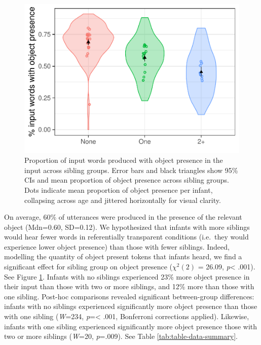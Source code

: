 \documentclass[
  english,
  man,floatsintext]{apa6}
\begin{document}
\begin{figure}
\centering
\includegraphics{SiblingsStudyText_files/figure-latex/Figure-object-presence-1.pdf}
\caption{\label{fig:Figure-object-presence}Proportion of input words produced with object presence in the input across sibling groups. Error bars and black triangles show 95\% CIs and mean proportion of object presence across sibling groups. Dots indicate mean proportion of object presence per infant, collapsing across age and jittered horizontally for visual clarity.}
\end{figure}

On average, 60\% of utterances were produced in the presence of the relevant object (Mdn=0.60, SD=0.12). We hypothesized that infants with more siblings would hear fewer words in referentially transparent conditions (i.e.~they would experience lower object presence) than those with fewer siblings. Indeed, modelling the quantity of object present tokens that infants heard, we find a significant effect for sibling group on object presence (\(\chi^2 (2)\) = 26.09, \emph{p}\textless{} .001). See Figure \ref{fig:Figure-object-presence}. Infants with no siblings experienced 23\% more object presence in their input than those with two or more siblings, and 12\% more than those with one sibling. Post-hoc comparisons revealed significant between-group differences: infants with no siblings experienced significantly more object presence than those with one sibling (\emph{W}=234, \emph{p}=\textless{} .001, Bonferroni corrections applied). Likewise, infants with one sibling experienced significantly more object presence those with two or more siblings (\emph{W}=20, \emph{p}=.009). See Table \ref{tab:table-data-summary}.
\end{document}
